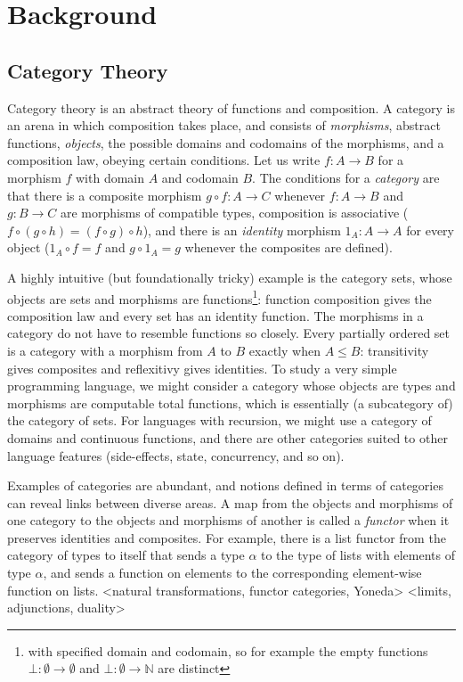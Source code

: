 \documentclass[twoside,titlepage,11pt]{article}
\begin{document}
\section{Background}%
\subsection{Category Theory}%
Category theory is an abstract theory of functions and composition.
A category is an arena in which composition takes place, and consists of \emph{morphisms}, abstract functions, \emph{objects}, the possible domains and codomains of the morphisms, and a composition law, obeying certain conditions.
Let us write $f:A\to B$ for a morphism $f$ with domain $A$ and codomain $B$.
The conditions for a \emph{category} are that there is a composite morphism $g\circ f:A\to C$ whenever $f:A\to B$ and $g:B\to C$ are morphisms of compatible types, composition is associative ($f\circ(g\circ h)=(f\circ g)\circ h$), and there is an \emph{identity} morphism ${1_A}:A\to A$ for every object (${1_A}\circ f=f$ and $g\circ{1_A}=g$ whenever the composites are defined).%

A highly intuitive (but foundationally tricky) example is the category sets, whose objects are sets and morphisms are functions\footnote{with specified domain and codomain, so for example the empty functions $\bot:\emptyset\to\emptyset$ and $\bot:\emptyset\to\mathbb{N}$ are distinct}: function composition gives the composition law and every set has an identity function.
The morphisms in a category do not have to resemble functions so closely.
Every partially ordered set is a category with a morphism from $A$ to $B$ exactly when $A\leq B$: transitivity gives composites and reflexitivy gives identities.
To study a very simple programming language, we might consider a category whose objects are types and morphisms are computable total functions, which is essentially (a subcategory of) the category of sets.
For languages with recursion, we might use a category of domains and continuous functions, and there are other categories suited to other language features (side-effects, state, concurrency, and so on).%

Examples of categories are abundant, and notions defined in terms of categories can reveal links between diverse areas.
A map from the objects and morphisms of one category to the objects and morphisms of another is called a \emph{functor} when it preserves identities and composites.
For example, there is a list functor from the category of types to itself that sends a type $\alpha$ to the type of lists with elements of type $\alpha$, and sends a function on elements to the corresponding element-wise function on lists.
<natural transformations, functor categories, Yoneda>
<limits, adjunctions, duality>%
\end{document}
